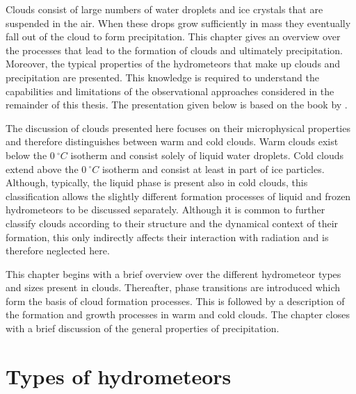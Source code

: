 Clouds consist of large numbers of water droplets and ice crystals that are
suspended in the air. When these drops grow sufficiently in mass they eventually
fall out of the cloud to form precipitation. This chapter gives an overview over
the processes that lead to the formation of clouds and ultimately precipitation.
Moreover, the typical properties of the hydrometeors that make up clouds and
precipitation are presented. This knowledge is required to understand the
capabilities and limitations of the observational approaches considered in the
remainder of this thesis. The presentation given below is based on the book
by \textcite{lohmann16}.

The discussion of clouds presented here focuses on their microphysical
properties and therefore distinguishes between warm and cold clouds. Warm clouds
exist below the $0\ \unit{^\circ C}$ isotherm and consist solely of liquid water
droplets. Cold clouds extend  above the $0\ \unit{^\circ C}$ isotherm and consist
at least in part of ice particles. Although, typically, the liquid phase is
present also in cold clouds, this classification allows the slightly different
formation processes of liquid and frozen hydrometeors to be discussed
separately. Although it is common to further classify clouds according
to their structure and the dynamical context of their formation, this
only indirectly affects their interaction with radiation and is therefore
neglected here.

This chapter begins with a brief overview over the different hydrometeor types
and sizes present in clouds. Thereafter, phase transitions are introduced which
form the basis of cloud formation processes. This is followed by a description
of the formation and growth processes in warm and cold clouds. The chapter
closes with a brief discussion of the general properties of precipitation.

\section{Types of hydrometeors}



